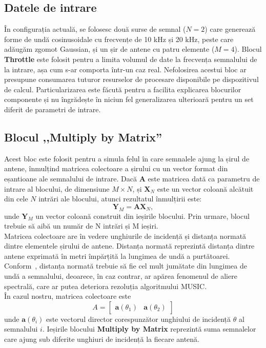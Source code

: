 \subsection{Datele de intrare}
În configurația actuală, se folosesc două surse de semnal ($N = 2$) care
generează forme de undă cosinusoidale cu frecvențe de 10 kHz și 20 kHz, peste
care adăugăm zgomot Gaussian, și un șir de antene cu patru elemente ($M = 4$).
Blocul \textbf{Throttle} este folosit pentru a limita volumul de date la
frecvența semnalului de la intrare, așa cum s-ar comporta într-un caz real.
Nefolosirea acestui bloc ar presupune consumarea tuturor resurselor de procesare
disponibile pe dispozitivul de calcul. Particularizarea este făcută pentru a
facilita explicarea blocurilor componente și nu îngrădește în niciun fel
generalizarea ulterioară pentru un set diferit de parametri de intrare.

\subsection{Blocul ,,Multiply by Matrix''}
Acest bloc este folosit pentru a simula felul în care semnalele ajung la șirul
de antene, înmulțind matricea colectoare a șirului cu un vector format din
eșantioane ale semnalului de intrare. Dacă  $\bm{A}$ este matricea dată ca
parametru de intrare al blocului, de dimensiune $M \times N$, și
$\bm{X}_N$ este un vector coloană alcătuit din cele $N$ intrări ale blocului,
atunci rezultatul înmulțirii este:
\begin{equation}
\bm{Y}_M = \bm{A}\bm{X}_N,
\end{equation}
unde $\bm{Y}_M$ un vector coloană construit din ieșirile blocului. Prin urmare,
blocul trebuie să aibă un număr de N intrări și M ieșiri. \\

Matricea colectoare are în vedere unghiurile de incidență și distanța
normată dintre elementele șirului de antene. Distanța normată reprezintă
distanța dintre antene exprimată în metri împărțită la lungimea de undă a purtătoarei.
Conform~\cite{ettus-doa}, distanța normată trebuie să fie cel mult jumătate
din lungimea de undă a semnalului, deoarece, în caz contrar, ar apărea fenomenul
de aliere spectrală, care ar putea deteriora rezoluția algoritmului MUSIC. \\

În cazul nostru, matricea colectoare este
\begin{displaymath}
    A
    =
    \begin{bmatrix}
        \bm{a}(\theta_1) & \bm{a}(\theta_2)
    \end{bmatrix}
\end{displaymath}
unde $\bm{a}(\theta_i)$  este vectorul director corespunzător unghiului de
incidență $\theta$ al semnalului $i$. Ieșirile blocului \textbf{Multiply by Matrix}
reprezintă suma semnalelor care ajung sub diferite unghiuri de incidență la
fiecare antenă.

